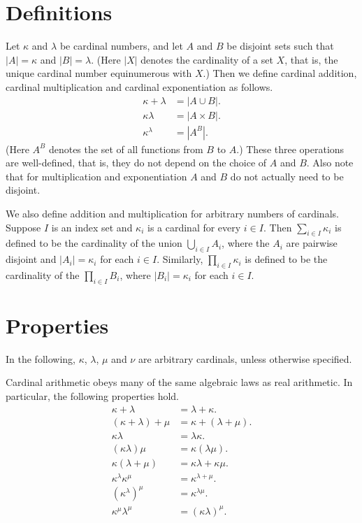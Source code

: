\documentclass[12pt]{article}
\begin{document}

\section*{Definitions}

Let $\kappa$ and $\lambda$ be cardinal numbers, 
and let $A$ and $B$ be disjoint sets such that $|A|=\kappa$ and $|B|=\lambda$.
(Here $|X|$ denotes the cardinality of a set $X$, 
that is, the unique cardinal number equinumerous with $X$.)
Then we define cardinal addition, cardinal multiplication 
and cardinal exponentiation as follows.
\begin{align*}
\kappa+\lambda&=|A\cup B|. \\
\kappa\lambda&=|A\times B|. \\
\kappa^\lambda&=|A^B|.
\end{align*}
(Here $A^B$ denotes the set of all functions from $B$ to $A$.)
These three operations are well-defined, that is, 
they do not depend on the choice of $A$ and $B$.
Also note that for multiplication and exponentiation $A$ 
and $B$ do not actually need to be disjoint.

We also define addition and multiplication for arbitrary numbers of cardinals.
Suppose $I$ is an index set and $\kappa_i$ is a cardinal for every $i\in I$.
Then $\sum_{i\in I}\kappa_i$ is defined to be 
the cardinality of the union $\bigcup_{i\in I}A_i$,
where the $A_i$ are pairwise disjoint and $|A_i|=\kappa_i$ for each $i\in I$.
Similarly, $\prod_{i\in I}\kappa_i$ is defined to be the cardinality of the 
$\prod_{i\in I}B_i$, where $|B_i|=\kappa_i$ for each $i\in I$.

\section*{Properties}

In the following, $\kappa$, $\lambda$, $\mu$ and $\nu$ are arbitrary cardinals,
unless otherwise specified.

Cardinal arithmetic obeys many of the same algebraic laws as real arithmetic.
In particular, the following properties hold.
\begin{align*}
\kappa+\lambda&=\lambda+\kappa.\\
(\kappa+\lambda)+\mu&=\kappa+(\lambda+\mu).\\
\kappa\lambda&=\lambda\kappa.\\
(\kappa\lambda)\mu&=\kappa(\lambda\mu).\\
\kappa(\lambda+\mu)&=\kappa\lambda+\kappa\mu.\\
\kappa^\lambda\kappa^\mu&=\kappa^{\lambda+\mu}.\\
(\kappa^\lambda)^\mu&=\kappa^{\lambda\mu}.\\
\kappa^\mu\lambda^\mu&=(\kappa\lambda)^\mu.
\end{align*}
\end{document}
